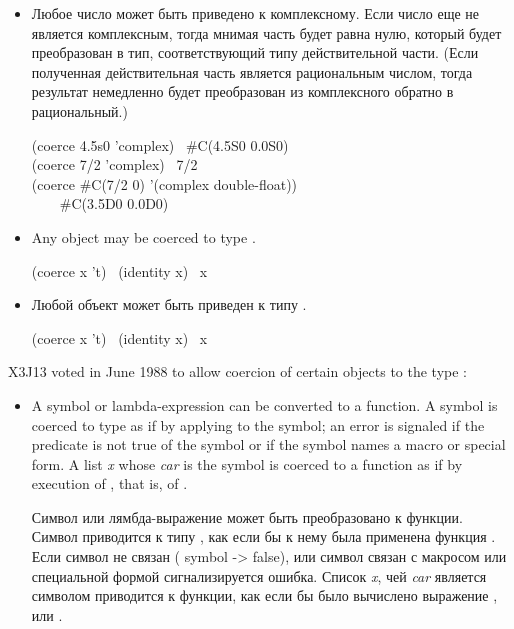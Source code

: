 \begin{defun}[Function]
\begin{itemize}
\item
Любое число может быть приведено к комплексному. Если число еще не является
комплексным, тогда мнимая часть будет равна нулю, который будет преобразован в
тип, соответствующий типу действительной части. (Если полученная действительная
часть является рациональным числом, тогда результат немедленно будет
преобразован из комплексного обратно в рациональный.)

\begin{lisp}
(coerce 4.5s0 'complex) \EV\ \#C(4.5S0 0.0S0) \\
(coerce 7/2 'complex) \EV\ 7/2 \\
(coerce \#C(7/2 0) '(complex double-float)) \\
~~~\EV\ \#C(3.5D0 0.0D0)
\end{lisp}

\item
Any object may be coerced to type .
\begin{lisp}
(coerce x 't) \EQ\ (identity x) \EQ\ x
\end{lisp}

\item
Любой объект может быть приведен к типу .
\begin{lisp}
(coerce x 't) \EQ\ (identity x) \EQ\ x
\end{lisp}

\end{itemize}

\begin{newer}
X3J13 voted in June 1988 
to allow coercion of certain objects to the type :
\begin{itemize}
\item
A symbol or lambda-expression can be converted to a function.
A symbol is coerced to type  as if by applying
 to the symbol; an error is signaled if the predicate
 is not true of
the symbol or if the symbol names a macro or special form.
A list \emph{x} whose \emph{car} is the symbol 
is coerced to a function as if by execution of ,
that is, of .

Символ или лямбда-выражение может быть преобразовано к функции.
Символ приводится к типу , как если бы к нему была применена
функция . Если символ не связан ( symbol ->
false), или символ связан с макросом или специальной формой сигнализируется
ошибка.
Список \emph{x}, чей \emph{car} является символом  приводится к
функции, как если бы было вычислено выражение ,
или .
\end{itemize}
\end{newer}


\end{defun}
